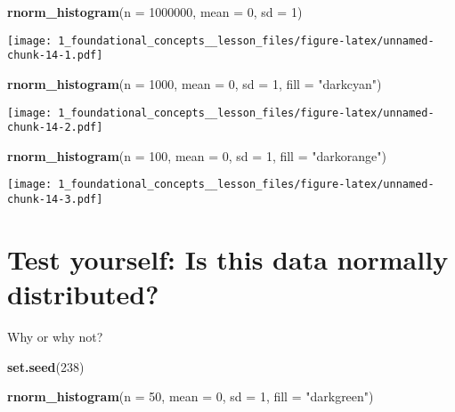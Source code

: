 \documentclass[
]{article}
\newenvironment{Shaded}{\begin{snugshade}}{\end{snugshade}}
\newcommand{\AttributeTok}[1]{\textcolor[rgb]{0.13,0.29,0.53}{#1}}
\newcommand{\DecValTok}[1]{\textcolor[rgb]{0.00,0.00,0.81}{#1}}
\newcommand{\FunctionTok}[1]{\textcolor[rgb]{0.13,0.29,0.53}{\textbf{#1}}}
\newcommand{\NormalTok}[1]{#1}
\newcommand{\StringTok}[1]{\textcolor[rgb]{0.31,0.60,0.02}{#1}}
\begin{document}
\begin{Shaded}
\begin{Highlighting}[]
\FunctionTok{rnorm\_histogram}\NormalTok{(}\AttributeTok{n =} \DecValTok{1000000}\NormalTok{, }
                \AttributeTok{mean =} \DecValTok{0}\NormalTok{, }
                \AttributeTok{sd =} \DecValTok{1}\NormalTok{) }
\end{Highlighting}
\end{Shaded}

\texttt{[image: 1\_foundational\_concepts\_\_lesson\_files/figure-latex/unnamed-chunk-14-1.pdf]}

\begin{Shaded}
\begin{Highlighting}[]
\FunctionTok{rnorm\_histogram}\NormalTok{(}\AttributeTok{n =} \DecValTok{1000}\NormalTok{, }
                \AttributeTok{mean =} \DecValTok{0}\NormalTok{, }
                \AttributeTok{sd =} \DecValTok{1}\NormalTok{, }
                \AttributeTok{fill =} \StringTok{"darkcyan"}\NormalTok{) }
\end{Highlighting}
\end{Shaded}

\texttt{[image: 1\_foundational\_concepts\_\_lesson\_files/figure-latex/unnamed-chunk-14-2.pdf]}

\begin{Shaded}
\begin{Highlighting}[]
\FunctionTok{rnorm\_histogram}\NormalTok{(}\AttributeTok{n =} \DecValTok{100}\NormalTok{, }
                \AttributeTok{mean =} \DecValTok{0}\NormalTok{, }
                \AttributeTok{sd =} \DecValTok{1}\NormalTok{, }
                \AttributeTok{fill =} \StringTok{"darkorange"}\NormalTok{)}
\end{Highlighting}
\end{Shaded}

\texttt{[image: 1\_foundational\_concepts\_\_lesson\_files/figure-latex/unnamed-chunk-14-3.pdf]}

\hypertarget{test-yourself-is-this-data-normally-distributed}{%
\section{Test yourself: Is this data normally
distributed?}\label{test-yourself-is-this-data-normally-distributed}}

Why or why not?

\begin{Shaded}
\begin{Highlighting}[]
\FunctionTok{set.seed}\NormalTok{(}\DecValTok{238}\NormalTok{)}

\FunctionTok{rnorm\_histogram}\NormalTok{(}\AttributeTok{n =} \DecValTok{50}\NormalTok{, }
                \AttributeTok{mean =} \DecValTok{0}\NormalTok{, }
                \AttributeTok{sd =} \DecValTok{1}\NormalTok{, }
                \AttributeTok{fill =} \StringTok{"darkgreen"}\NormalTok{) }
\end{Highlighting}
\end{Shaded}
\end{document}
